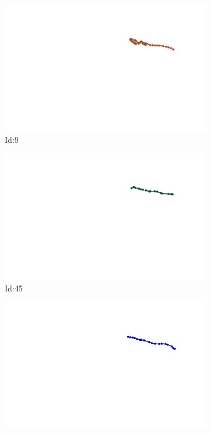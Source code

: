 \documentclass[12pt,twoside]{report}
\begin{document}
\begin{figure}
\centering
\begin{subfigure}[b]{0.20\textwidth}
\centering
\includegraphics[width=\textwidth]{../trajectories/9.png}
\caption{Id:9}
\end{subfigure}
\begin{subfigure}[b]{0.20\textwidth}
\centering
\includegraphics[width=\textwidth]{../trajectories/45.png}
\caption{Id:45}
\end{subfigure}
\begin{subfigure}[b]{0.20\textwidth}
\centering
\includegraphics[width=\textwidth]{../trajectories/46.png}

\end{subfigure}
\end{figure}
\end{document}
